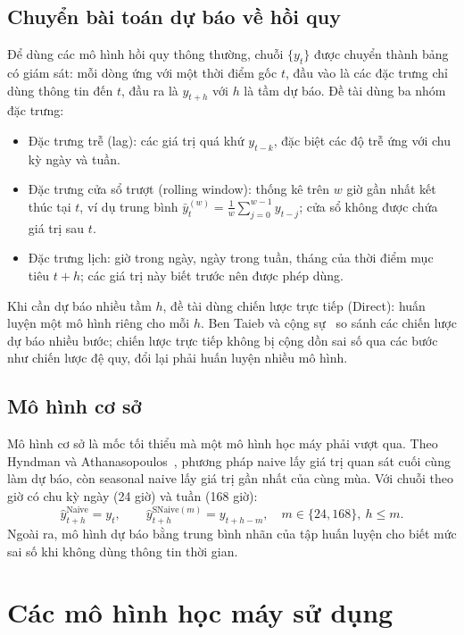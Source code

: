 \subsection{Chuyển bài toán dự báo về hồi quy}
Để dùng các mô hình hồi quy thông thường, chuỗi $\{y_t\}$ được chuyển thành bảng có giám sát: mỗi dòng ứng với một thời điểm gốc $t$, đầu vào là các đặc trưng chỉ dùng thông tin đến $t$, đầu ra là $y_{t+h}$ với $h$ là tầm dự báo. Đề tài dùng ba nhóm đặc trưng:
\begin{itemize}
    \item Đặc trưng trễ (lag): các giá trị quá khứ $y_{t-k}$, đặc biệt các độ trễ ứng với chu kỳ ngày và tuần.
    \item Đặc trưng cửa sổ trượt (rolling window): thống kê trên $w$ giờ gần nhất kết thúc tại $t$, ví dụ trung bình $\bar{y}^{(w)}_t = \frac{1}{w}\sum_{j=0}^{w-1} y_{t-j}$; cửa sổ không được chứa giá trị sau $t$.
    \item Đặc trưng lịch: giờ trong ngày, ngày trong tuần, tháng của thời điểm mục tiêu $t+h$; các giá trị này biết trước nên được phép dùng.
\end{itemize}
Khi cần dự báo nhiều tầm $h$, đề tài dùng chiến lược trực tiếp (Direct): huấn luyện một mô hình riêng cho mỗi $h$. Ben Taieb và cộng sự~\cite{bentaieb2012review} so sánh các chiến lược dự báo nhiều bước; chiến lược trực tiếp không bị cộng dồn sai số qua các bước như chiến lược đệ quy, đổi lại phải huấn luyện nhiều mô hình.

\subsection{Mô hình cơ sở}
Mô hình cơ sở là mốc tối thiểu mà một mô hình học máy phải vượt qua. Theo Hyndman và Athanasopoulos~\cite[mục 5.2]{hyndman2021fpp3}, phương pháp naive lấy giá trị quan sát cuối cùng làm dự báo, còn seasonal naive lấy giá trị gần nhất của cùng mùa. Với chuỗi theo giờ có chu kỳ ngày (24 giờ) và tuần (168 giờ):
\begin{equation}
    \hat{y}^{\text{Naive}}_{t+h} = y_t, \qquad
    \hat{y}^{\text{SNaive}(m)}_{t+h} = y_{t+h-m}, \quad m \in \{24, 168\},\ h \le m.
    \label{eq:baselines}
\end{equation}
Ngoài ra, mô hình dự báo bằng trung bình nhãn của tập huấn luyện cho biết mức sai số khi không dùng thông tin thời gian.

\section{Các mô hình học máy sử dụng}
\label{sec:models_theory}

